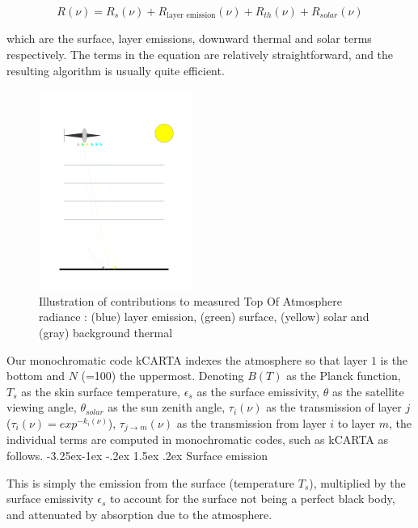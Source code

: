 \documentclass[11pt]{article}
\makeatletter
\newcommand{\kc}{\textsf{kCARTA}\xspace}
\renewcommand{\subsection}{\@startsection{subsection}{2}{\z@}%
                                     {-3.25ex\@plus -1ex \@minus -.2ex}%
                                     {1.5ex \@plus .2ex}%
                                     {\reset@font\normalsize\bfseries}}
\makeatother
\begin{document}
\begin{equation}
R(\nu) = R_{s}(\nu) + R_{\text{layer emission}}(\nu) + R_{th}(\nu) + R_{solar}(\nu)
\label{eqn:sch_detail}
\end{equation}

which are the surface, layer emissions, downward thermal and solar terms
respectively. The terms in the equation are relatively straightforward, and the resulting algorithm is 
usually quite efficient. 

\begin{figure}
\centering
\includegraphics[width=0.45\textwidth]{Figs/radiation1.pdf}
\caption{Illustration of contributions to measured Top Of Atmosphere radiance :
 (blue) layer emission, (green) surface, (yellow) solar and (gray) background thermal}
\end{figure}
Our monochromatic code \kc indexes the atmosphere so that layer $1$ is the bottom and
$N$ (=100) the uppermost. Denoting $B(T)$ as the Planck function, $T_{s}$ as
the skin surface temperature, $\epsilon_{s}$ as the surface emissivity,
$\theta$ as the satellite viewing angle, $\theta_{solar}$ as the sun zenith
angle, $\tau_{i}(\nu)$ as the transmission of layer $j$
($\tau_{i}(\nu) = exp^{-k_{i}(\nu)}$), $\tau_{j \rightarrow m}(\nu)$ as the
transmission from layer $i$ to layer $m$, the individual terms are computed in
monochromatic codes, such as \kc as follows.
\subsection{Surface emission}

This is simply the emission from the surface (temperature $T_{s}$),
multiplied by the surface emissivity $\epsilon_{s}$ to account for the surface
not being a perfect black body, and attenuated by absorption due to the
atmosphere.
\end{document}
